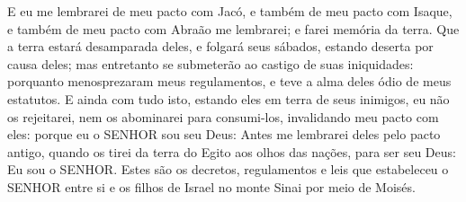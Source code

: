 {{  E eu me lembrarei de meu pacto com Jacó, e também de meu pacto com Isaque, e também de meu pacto com Abraão me lembrarei; e farei memória da terra.
  Que a terra estará desamparada deles, e folgará seus sábados, estando deserta por causa deles; mas entretanto se submeterão ao castigo de suas iniquidades: porquanto menosprezaram meus regulamentos, e teve a alma deles ódio de meus estatutos.
  E ainda com tudo isto, estando eles em terra de seus inimigos, eu não os rejeitarei, nem os abominarei para consumi-los, invalidando meu pacto com eles: porque eu o SENHOR sou seu Deus:
  Antes me lembrarei deles pelo pacto antigo, quando os tirei da terra do Egito aos olhos das nações, para ser seu Deus: Eu sou o SENHOR}.
  Estes são os decretos, regulamentos e leis que estabeleceu o SENHOR entre si e os filhos de Israel no monte Sinai por meio de Moisés.
\par }

